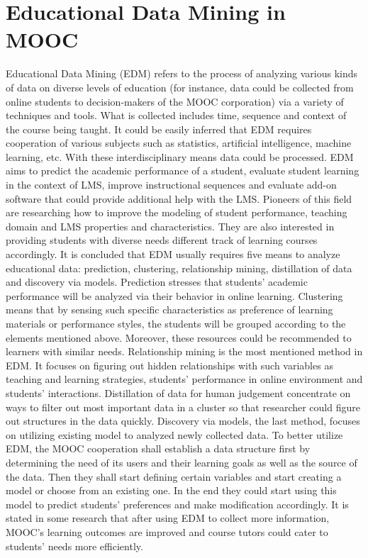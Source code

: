 \documentclass[sigconf]{acmart}
\begin{document}
\section{Educational Data Mining in MOOC}
Educational Data Mining (EDM) refers to the process of analyzing various kinds of data on diverse levels of education (for instance, data could be collected from online students to decision-makers of the MOOC corporation) via a variety of techniques and tools. What is collected includes time, sequence and context of the course being taught. It could be easily inferred that EDM requires cooperation of various subjects such as statistics, artificial intelligence, machine learning, etc. With these interdisciplinary means data could be processed. 
EDM aims to predict the academic performance of a student, evaluate student learning in the context of LMS, improve instructional sequences and evaluate add-on software that could provide additional help with the LMS. Pioneers of this field are researching how to improve the modeling of student performance, teaching domain and LMS properties and characteristics.  They are also interested in providing students with diverse needs different track of learning courses accordingly.
It is concluded that EDM usually requires five means to analyze educational data: prediction, clustering, relationship mining, distillation of data and discovery via models. Prediction stresses that students’ academic performance will be analyzed via their behavior in online learning. Clustering means that by sensing such specific characteristics as preference of learning materials or performance styles, the students will be grouped according to the elements mentioned above. Moreover, these resources could be recommended to learners with similar needs. Relationship mining is the most mentioned method in EDM. It focuses on figuring out hidden relationships with such variables as teaching and learning strategies, students’ performance in online environment and students’ interactions. Distillation of data for human judgement concentrate on ways to filter out most important data in a cluster so that researcher could figure out structures in the data quickly. Discovery via models, the last method, focuses on utilizing existing model to analyzed newly collected data.
To better utilize EDM, the MOOC cooperation shall establish a data structure first by determining the need of its users and their learning goals as well as the source of the data. Then they shall start defining certain variables and start creating a model or choose from an existing one. In the end they could start using this model to predict students’ preferences and make modification accordingly. It is stated in some research that after using EDM to collect more information, MOOC’s learning outcomes are improved and course tutors could cater to students’ needs more efficiently.
\end{document}
